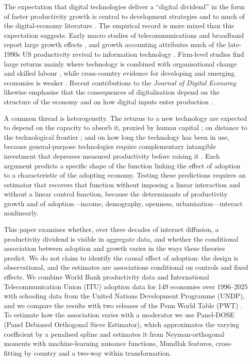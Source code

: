 \documentclass[pdflatex,sn-basic]{sn-jnl}%
\theoremstyle{thmstyleone}
\theoremstyle{thmstyletwo}
\begin{document}
The expectation that digital technologies deliver a ``digital dividend'' in the form of faster productivity growth is central to development strategies and to much of the digital-economy literature \citep{worldbank2016wdr,goldfarb2019digital}. The empirical record is more mixed than this expectation suggests. Early macro studies of telecommunications and broadband report large growth effects \citep{roller2001telecom,koutroumpis2009broadband,czernich2011broadband}, and growth accounting attributes much of the late-1990s US productivity revival to information technology \citep{jorgenson2008retro,jorgenson2016ict}. Firm-level studies find large returns mainly where technology is combined with organisational change and skilled labour \citep{brynjolfsson2000beyond,bresnahan2002it,bloom2012americans}, while cross-country evidence for developing and emerging economies is weaker \citep{niebel2018ict,vu2020ict,cardona2013ict}. Recent contributions to the \textit{Journal of Digital Economy} likewise emphasise that the consequences of digitalisation depend on the structure of the economy and on how digital inputs enter production \citep{banga2026digitalisation,chen2026production}.

A common thread is heterogeneity. The returns to a new technology are expected to depend on the capacity to absorb it, proxied by human capital \citep{nelson1966,benhabib1994,cohen1990absorptive}; on distance to the technological frontier \citep{acemoglu2006frontier}; and on how long the technology has been in use, because general-purpose technologies require complementary intangible investment that depresses measured productivity before raising it \citep{brynjolfsson2021jcurve}. Each argument predicts a specific shape of the function linking the effect of adoption to a characteristic of the adopting economy. Testing these predictions requires an estimator that recovers that function without imposing a linear interaction and without a linear control function, because the determinants of productivity growth and of adoption---income, demography, openness, urbanisation---interact nonlinearly.

This paper examines whether, over three decades of internet diffusion, a productivity dividend is visible in aggregate data, and whether the conditional association between adoption and growth varies in the ways these theories predict. We do not claim to identify the causal effect of adoption: the design is observational, and the estimates are associations conditional on controls and fixed effects. We combine World Bank productivity data and International Telecommunication Union (ITU) adoption data for 149 economies over 1996--2025 with schooling data from the United Nations Development Programme (UNDP), and we compare the results with two releases of the Penn World Table (PWT) \citep{feenstra2015pwt,pwt11}. To estimate how the association varies with a moderator we use Panel-DOSE (Panel Debiased Orthogonal Sieve Estimator), which approximates the varying coefficient by a penalised spline and estimates it from Neyman-orthogonal moments with machine-learning nuisance functions, Mundlak features, cross-fitting by country and a two-way within transformation.
\end{document}
